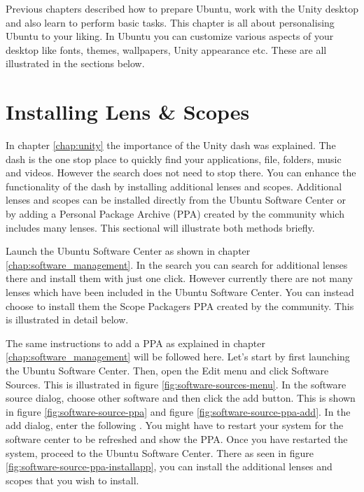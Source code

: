 Previous chapters described how to prepare Ubuntu, work with the Unity desktop and also learn to perform basic tasks. This chapter is all about personalising Ubuntu to your liking. In Ubuntu you can customize various aspects of your desktop like fonts, themes, wallpapers, Unity appearance etc. These are all illustrated in the sections below.

\section{Installing Lens \& Scopes} 
In chapter \ref{chap:unity} the importance of the Unity dash was explained. The dash is the one stop place to quickly find your applications, file, folders, music and videos. However the search does not need to stop there. You can enhance the functionality of the dash by installing additional lenses and scopes. Additional lenses and scopes can be installed directly from the Ubuntu Software Center or by adding a Personal Package Archive (PPA) created by the community which includes many lenses. This sectional will illustrate both methods briefly. \\

\par \noindent Launch the Ubuntu Software Center as shown in chapter \ref{chap:software_management}. In the search you can search for additional lenses there and install them with just one click. However currently there are not many lenses which have been included in the Ubuntu Software Center. You can instead choose to install them the Scope Packagers PPA created by the community. This is illustrated in detail below. \\

\par \noindent The same instructions to add a PPA as explained in chapter \ref{chap:software_management} will be followed here. Let's start by first launching the Ubuntu Software Center. Then, open the Edit menu and click Software Sources. This is illustrated in figure \ref{fig:software-sources-menu}. In the software source dialog, choose other software and then click the add button. This is shown in figure \ref{fig:software-source-ppa}	and figure \ref{fig:software-source-ppa-add}. In the add dialog, enter the following . You might have to restart your system for the software center to be refreshed and show the PPA. Once you have restarted the system, proceed to the Ubuntu Software Center. There as seen in figure \ref{fig:software-source-ppa-installapp}, you can install the additional lenses and scopes that you wish to install.

